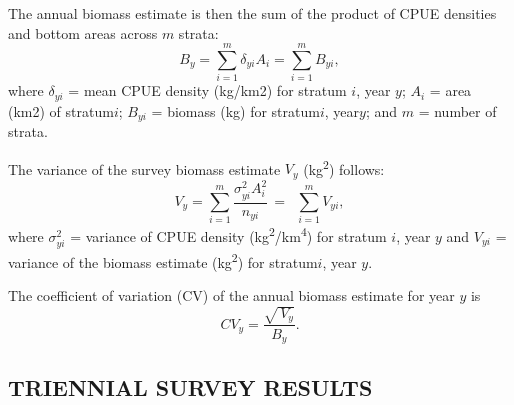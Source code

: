 \documentclass[11pt]{book}
\begin{document}
The annual biomass estimate is then the sum of the product of CPUE densities and bottom areas across \(m\) strata:
\begin{equation}
{B_y} = \sum\limits_{i = 1}^m {{\delta _{yi}}{A_i}}  = \sum\limits_{i = 1}^m {{B_{yi}}},
\end{equation}
where \({\delta _{yi}}\) = mean CPUE density (kg/km2) for stratum \(i\), year \(y\); \({A_i}\) = area (km2) of stratum\(i\); \({B_{yi}}\) = biomass (kg) for stratum\(i\), year\(y\); and \(m\) = number of strata.

The variance of the survey biomass estimate \({V_y}\) (kg\textsuperscript{2}) follows:
\begin{equation}
{V_y} = \sum\limits_{i = 1}^m {\frac{{\sigma _{yi}^2A_i^2}}{{{n_{yi}}}}\,}  = \,\,\,\sum\limits_{i = 1}^m {{V_{yi}}},
\end{equation}
where \(\sigma _{yi}^2\) = variance of CPUE density (kg\textsuperscript{2}/km\textsuperscript{4}) for stratum \(i\), year \(y\) and \({V_{yi}}\) = variance of the biomass estimate (kg\textsuperscript{2}) for stratum\(i\), year \(y\).

The coefficient of variation (CV) of the annual biomass estimate for year \(y\) is
\begin{equation}
C{V_y} = \frac{{\sqrt {\,{V_y}} }}{{{B_y}}}.
\end{equation}
\hypertarget{triennial-survey-results}{%
\subsection{TRIENNIAL SURVEY RESULTS}\label{triennial-survey-results}}
\end{document}
